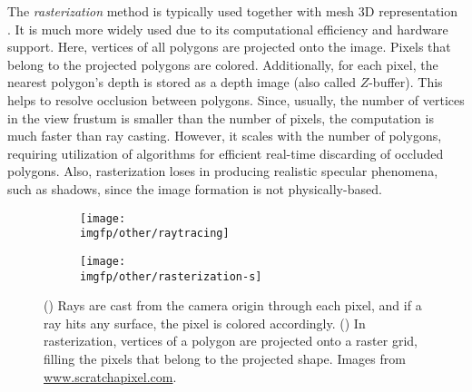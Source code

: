 The \textit{rasterization} method is typically used together with mesh 3D representation \cite{aux:raster94}. It is much more widely used due to its computational efficiency and hardware support. Here, vertices of all polygons are projected onto the image. Pixels that belong to the projected polygons are colored. Additionally, for each pixel, the nearest polygon's depth is stored as a depth image (also called $Z$-buffer). This helps to resolve occlusion between polygons. Since, usually, the number of vertices in the view frustum is smaller than the number of pixels, the computation is much faster than ray casting. However, it scales with the number of polygons, requiring utilization of algorithms for efficient real-time discarding of occluded polygons. Also, rasterization loses in producing realistic specular phenomena, such as shadows, since the image formation is not physically-based.




\begin{figure}[h!]
	\centering
	\begin{subfigure}[b]{0.49\textwidth}
		\centering
		\texttt{[image: \\imgfp/other/raytracing]}
		\caption{}
		\label{lit:fig:raytracing}
	\end{subfigure}
	\hfill
	\begin{subfigure}[b]{0.49\textwidth}
		\centering
		\texttt{[image: \\imgfp/other/rasterization-s]}
		\caption{}
		\label{lit:fig:rasterization}
	\end{subfigure}
	
	\caption{(\protect{}) Rays are cast from the camera origin through each pixel, and if a ray hits any surface, the pixel is colored accordingly. (\protect{}) In rasterization, vertices of a polygon are projected onto a raster grid, filling the pixels that belong to the projected shape. Images from \href{https://www.scratchapixel.com/}{www.scratchapixel.com}.}
	\label{lit:fig:rendering-methods}
\end{figure}

